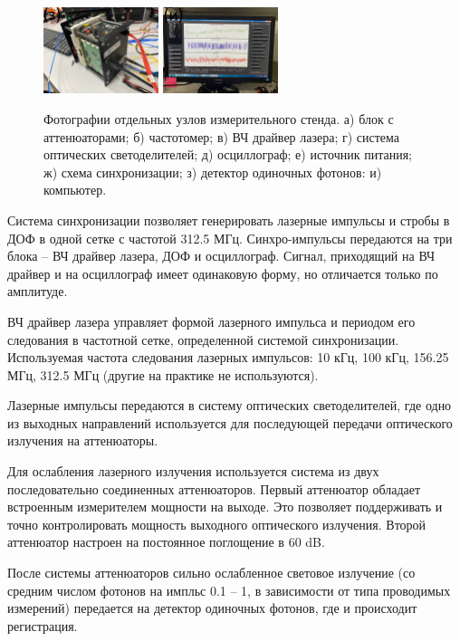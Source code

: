 \documentclass[12pt]{article}
\begin{document}
\begin{figure}[h]
    \includegraphics[width=0.3\textwidth]{spd}
    \includegraphics[width=0.3\textwidth]{comp}
   \caption{Фотографии отдельных узлов измерительного стенда. а) блок с аттенюаторами; б) частотомер; в) ВЧ драйвер лазера; г) система оптических светоделителей; д) осциллограф; е) источник питания; ж) схема синхронизации; з) детектор одиночных фотонов: и) компьютер. }
   \label{fig:stand_pics}
\end{figure}


Система синхронизации позволяет генерировать лазерные импульсы и стробы в ДОФ в одной сетке с частотой 312.5 МГц. Синхро-импульсы передаются на три блока -- ВЧ драйвер лазера, ДОФ и осциллограф. Сигнал, приходящий на ВЧ драйвер и на осциллограф имеет одинаковую форму, но отличается только по амплитуде. 

ВЧ драйвер лазера управляет формой лазерного импульса и периодом его следования в частотной сетке, определенной системой синхронизации. Используемая частота следования лазерных импульсов: 10 кГц, 100 кГц, 156.25 МГц, 312.5 МГц (другие на практике не используются).

Лазерные импульсы передаются в систему оптических светоделителей, где одно из выходных направлений используется для последующей передачи оптического излучения на аттенюаторы. 

Для ослабления лазерного излучения используется система из двух последовательно соединенных аттенюаторов. Первый аттенюатор обладает встроенным измерителем мощности на выходе. Это позволяет поддерживать и точно контролировать мощность выходного оптического излучения. Второй аттенюатор настроен на постоянное поглощение в 60 dB. 

После системы аттенюаторов сильно ослабленное световое излучение (со средним числом фотонов на импльс 0.1 -- 1, в зависимости от типа проводимых измерений) передается на детектор одиночных фотонов, где и происходит регистрация. 
\end{document}
